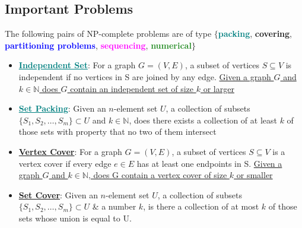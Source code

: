 \subsection*{Important Problems}
The following pairs of NP-complete problems are of type $\{$\textcolor{teal}{\textbf{packing}}, \textcolor{Bittersweet}{\textbf{covering}}, \textcolor{Blue}{\textbf{partitioning problems}}, \textcolor{Magenta}{\textbf{sequencing}}, \textcolor{ForestGreen}{\textbf{numerical}}$\}$
\begin{itemize}
    \item \textcolor{teal}{\textbf{\ul{Independent Set}}}: For a graph $G = (V,E)$, a subset of vertices $S \subseteq V$ is independent if no vertices in S are joined by any edge. \ul{Given a graph $G$ and $k \in \mathbb{N}$ does $G$ contain an independent set of size $k$ or larger }
    \item \textcolor{teal}{\textbf{\ul{Set Packing}}}: Given an $n$-element set $U$,  a collection of subsets $\{S_1, S_2, \ldots, S_m \} \subset U$ and $k \in \mathbb{N}$, does there exists a collection of at least $k$ of those sets with property that no two of them intersect
    
    \item \textcolor{Bittersweet}{\textbf{\ul{Vertex Cover}}}: For a graph $G = (V, E)$, a subset of vertices $S \subseteq V$ is a vertex cover if every edge $e \in E$ has at least one endpoints in S. \ul{Given a graph $G$ and $k \in \mathbb{N}$, does G contain a vertex cover of size $k$ or smaller}
    \item \textcolor{Bittersweet}{\textbf{\ul{Set Cover}}}: Given an $n$-element set $U$, a collection of subsets $\{S_1, S_2, \ldots, S_m\} \subset U$ \& a number $k$, is there a collection of at most $k$ of those sets whose union is equal to U.
    

\end{itemize}
